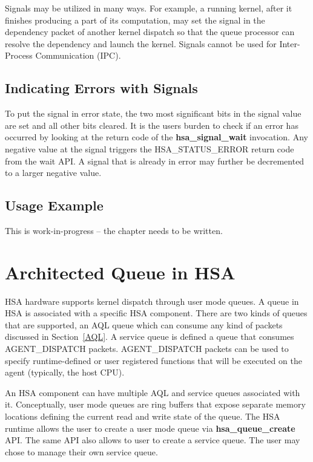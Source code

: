 \documentclass{book}
\newcommand{\reffun}[1]{\textbf{#1}}
\newcommand{\reftyp}[1]{#1}
\newcommand{\refenu}[1]{\reftyp{#1}}
\begin{document}
Signals may be utilized in many ways. For example, a running kernel,
after it finishes producing a part of its computation, may set the
signal in the dependency packet of another kernel dispatch so that the
queue processor can resolve the dependency and launch the
kernel. Signals cannot be used for Inter-Process Communication (IPC).

\hypertarget{signal_error}{} \subsection{ Indicating Errors with
  Signals} \label{signal_error} To put the signal in error state, the
two most significant bits in the signal value are set and all other
bits cleared. It is the users burden to check if an error has occurred
by looking at the return code of the \reffun{hsa\_signal\_wait}
invocation. Any negative value at the signal triggers the
\refenu{HSA\_STATUS\_ERROR} return code from the wait API. A signal
that is already in error may further be decremented to a larger
negative value.

\hypertarget{signal_example}{} \subsection{Usage Example}
This is {\color{red} work-in-progress} -- the chapter needs to be written.
\label{signal_example}


\hypertarget{architected\_queue}{} \section{Architected Queue in
HSA} \label{architected_queue}

HSA hardware supports kernel dispatch through user mode queues.  A
queue in HSA is associated with a specific HSA component. There are
two kinds of queues that are supported, an AQL queue which can consume
any kind of packets discussed in Section~\ref{AQL}. A service queue is
defined a queue that consumes \refenu{AGENT\_DISPATCH}
packets. \refenu{AGENT\_DISPATCH} packets can be used to specify
runtime-defined or user registered functions that will be executed on
the agent (typically, the host CPU).

An HSA component can have multiple AQL and service queues associated
with it.  Conceptually, user mode queues are ring buffers that
expose separate memory locations defining the current read and write
state of the queue. The HSA runtime allows the user to create a user
mode queue via \reffun{hsa\_queue\_create} API. The same API also
allows to user to create a service queue. The user may chose to
manage their own service queue.
\end{document}
